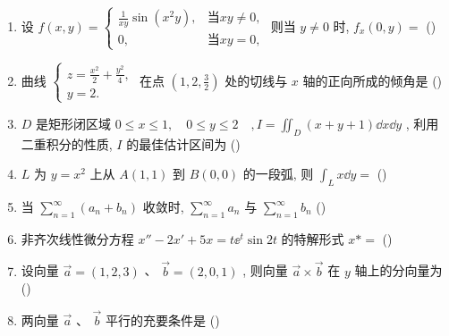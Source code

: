 \begin{enumerate}
	\item 设 $f(x,y)=\begin{cases}
	\frac{1}{xy}\sin\left(x^2y\right), & \text{当}xy\ne0,\\
	0, & \text{当}xy=0,
	\end{cases}$ 则当 $y\ne0$ 时, $f_{x}(0,y)=$ (\hspace{1pc})
	
	\item 曲线 $\begin{cases}
	z=\frac{x^2}{2}+\frac{y^2}{4},\\
	y=2.
	\end{cases}$ 在点 $\left( 1,2,\frac{3}{2} \right)$ 处的切线与 $x$ 轴的正向所成的倾角是 (\hspace{1pc})
	
	\item $D$ 是矩形闭区域 $0 \leq x \leq 1, \quad 0 \leq y \leq 2 \quad, I=\iint_{D}(x+y+1) \dd x \dd y$ , 利用二重积分的性质, $I$ 的最佳估计区间为 (\hspace{1pc})
	
	\item $L$ 为 $y=x^2$ 上从 $A(1,1)$ 到 $B(0,0)$ 的一段弧, 则 $\int_{L}x\dd y=$ (\hspace{1pc})

	\item 当 $\sum_{n=1}^{\infty}\left(a_{n}+b_{n}\right)$ 收敛时, $\sum_{n=1}^{\infty} a_{n}$ 与 $\sum_{n=1}^{\infty} b_{n}$ (\hspace{1pc})
	
	\item 非齐次线性微分方程 $x''-2 x'+5 x=t \ee^{t} \sin 2 t$ 的特解形式 $x*=$ (\hspace{1pc})
	
	\item 设向量 $\vec{a}=(1,2,3)$ 、 $\vec{b}=(2,0,1)$ , 则向量 $\vec{a}\times\vec{b}$ 在 $y$ 轴上的分向量为 (\hspace{1pc})
	
	\item 两向量 $\vec{a}$ 、 $\vec{b}$ 平行的充要条件是 (\hspace{1pc})
	

\end{enumerate}
